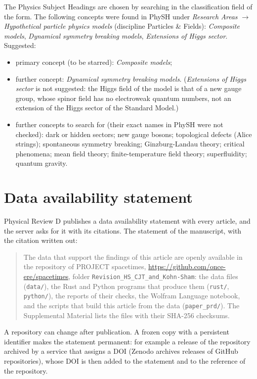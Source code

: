 \documentclass[11pt]{article}
\begin{document}
The Physics Subject Headings are chosen by searching in the classification field of the form. The following concepts
were found in PhySH under \emph{Research Areas} $\to$ \emph{Hypothetical particle physics models} (discipline Particles
\& Fields): \emph{Composite models}, \emph{Dynamical symmetry breaking models}, \emph{Extensions of Higgs sector}. Suggested:
\begin{itemize}
\item primary concept (to be starred): \emph{Composite models};
\item further concept: \emph{Dynamical symmetry breaking models}. (\emph{Extensions of Higgs sector} is not suggested:
the Higgs field of the model is that of a new gauge group, whose spinor field has no electroweak quantum numbers, not an
extension of the Higgs sector of the Standard Model.)
\item further concepts to search for (their exact names in PhySH were not checked): dark or hidden sectors; new gauge
bosons; topological defects (Alice strings); spontaneous symmetry breaking; Ginzburg-Landau theory; critical phenomena;
mean field theory; finite-temperature field theory; superfluidity; quantum gravity.
\end{itemize}

\section{Data availability statement}
\label{sec:das}

Physical Review D publishes a data availability statement with every article, and the server asks for it with its
citations. The statement of the manuscript, with the citation written out:

\begin{quote}
The data that support the findings of this article are openly available in the repository of PROJECT spacetimes,
\url{https://github.com/once-ere/spacetimes}, folder \texttt{Revision\_HS\_CJT\_and\_Kohn-Sham}: the data files
(\texttt{data/}), the Rust and Python programs that produce them (\texttt{rust/}, \texttt{python/}), the reports of their
checks, the Wolfram Language notebook, and the scripts that build this article from the data (\texttt{paper\_prd/}). The
Supplemental Material lists the files with their SHA-256 checksums.
\end{quote}

A repository can change after publication. A frozen copy with a persistent identifier makes the statement permanent: for
example a release of the repository archived by a service that assigns a DOI (Zenodo archives releases of GitHub
repositories), whose DOI is then added to the statement and to the reference of the repository.
\end{document}
